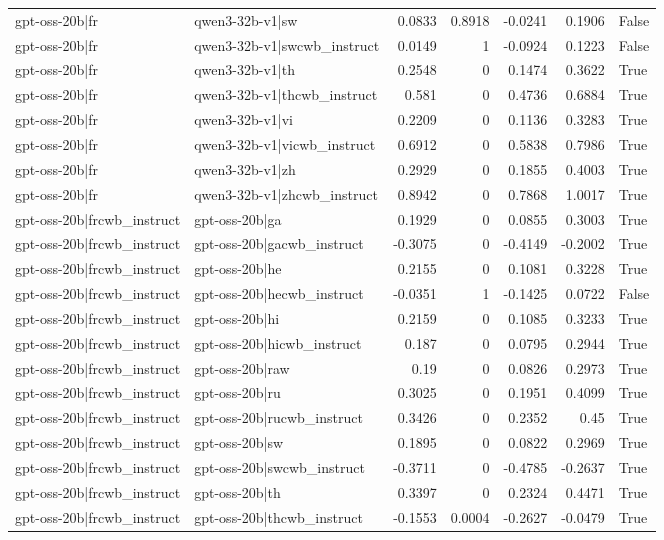 \begin{table}
\begin{tabular}{l l r r r r l}
gpt-oss-20b|fr & qwen3-32b-v1|sw & 0.0833 & 0.8918 & -0.0241 & 0.1906 & False \\
gpt-oss-20b|fr & qwen3-32b-v1|swcwb_instruct & 0.0149 & 1 & -0.0924 & 0.1223 & False \\
gpt-oss-20b|fr & qwen3-32b-v1|th & 0.2548 & 0 & 0.1474 & 0.3622 & True \\
gpt-oss-20b|fr & qwen3-32b-v1|thcwb_instruct & 0.581 & 0 & 0.4736 & 0.6884 & True \\
gpt-oss-20b|fr & qwen3-32b-v1|vi & 0.2209 & 0 & 0.1136 & 0.3283 & True \\
gpt-oss-20b|fr & qwen3-32b-v1|vicwb_instruct & 0.6912 & 0 & 0.5838 & 0.7986 & True \\
gpt-oss-20b|fr & qwen3-32b-v1|zh & 0.2929 & 0 & 0.1855 & 0.4003 & True \\
gpt-oss-20b|fr & qwen3-32b-v1|zhcwb_instruct & 0.8942 & 0 & 0.7868 & 1.0017 & True \\
gpt-oss-20b|frcwb_instruct & gpt-oss-20b|ga & 0.1929 & 0 & 0.0855 & 0.3003 & True \\
gpt-oss-20b|frcwb_instruct & gpt-oss-20b|gacwb_instruct & -0.3075 & 0 & -0.4149 & -0.2002 & True \\
gpt-oss-20b|frcwb_instruct & gpt-oss-20b|he & 0.2155 & 0 & 0.1081 & 0.3228 & True \\
gpt-oss-20b|frcwb_instruct & gpt-oss-20b|hecwb_instruct & -0.0351 & 1 & -0.1425 & 0.0722 & False \\
gpt-oss-20b|frcwb_instruct & gpt-oss-20b|hi & 0.2159 & 0 & 0.1085 & 0.3233 & True \\
gpt-oss-20b|frcwb_instruct & gpt-oss-20b|hicwb_instruct & 0.187 & 0 & 0.0795 & 0.2944 & True \\
gpt-oss-20b|frcwb_instruct & gpt-oss-20b|raw & 0.19 & 0 & 0.0826 & 0.2973 & True \\
gpt-oss-20b|frcwb_instruct & gpt-oss-20b|ru & 0.3025 & 0 & 0.1951 & 0.4099 & True \\
gpt-oss-20b|frcwb_instruct & gpt-oss-20b|rucwb_instruct & 0.3426 & 0 & 0.2352 & 0.45 & True \\
gpt-oss-20b|frcwb_instruct & gpt-oss-20b|sw & 0.1895 & 0 & 0.0822 & 0.2969 & True \\
gpt-oss-20b|frcwb_instruct & gpt-oss-20b|swcwb_instruct & -0.3711 & 0 & -0.4785 & -0.2637 & True \\
gpt-oss-20b|frcwb_instruct & gpt-oss-20b|th & 0.3397 & 0 & 0.2324 & 0.4471 & True \\
gpt-oss-20b|frcwb_instruct & gpt-oss-20b|thcwb_instruct & -0.1553 & 0.0004 & -0.2627 & -0.0479 & True \\

\end{tabular}
\end{table}
